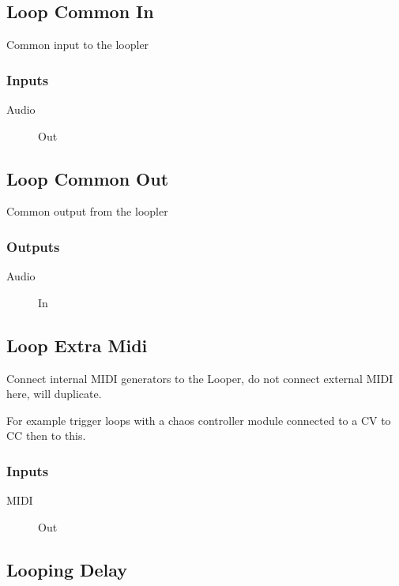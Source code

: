 \subsection{Loop Common In}

Common input to the loopler



\subsubsection{Inputs}
\begin{description}
\item [Audio] Out
\end{description}

\subsection{Loop Common Out}

Common output from the loopler



\subsubsection{Outputs}
\begin{description}
\item [Audio] In
\end{description}

\subsection{Loop Extra Midi}

Connect internal MIDI generators to the Looper, do not connect external MIDI here, will duplicate.

For example trigger loops with a chaos controller module connected to a CV to CC then to this.

\subsubsection{Inputs}
\begin{description}
\item [MIDI] Out
\end{description}

\subsection{Looping Delay}

